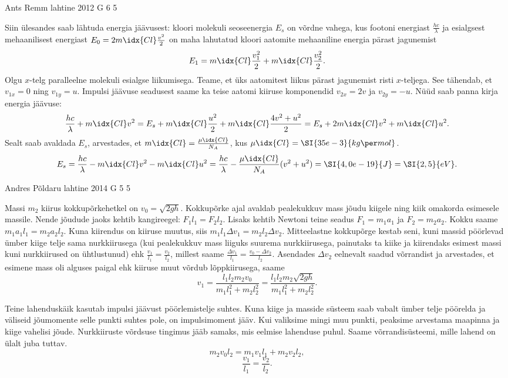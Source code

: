 \documentclass[11pt, twoside]{article}
\begin{document}
{%
{Ants Remm} %
{lahtine} %
{2012} %
{G 6} %
{5} %
{

\ifSolution
Siin ülesandes saab lähtuda energia jäävusest: kloori molekuli seoseenergia $E_s$ on võrdne vahega, kus footoni energiast $\frac{hc}{\lambda}$ ja esialgsest mehaanilisest energiast $E_0 = 2m\idx{Cl} \frac{v^2}{2} $ on maha lahutatud kloori aatomite mehaaniline energia pärast jagunemist
\[
E_1 = m\idx{Cl} \frac{v_1^2}{2} + m\idx{Cl} \frac{v_2^2}{2}.
\]
Olgu $x$-telg paralleelne molekuli esialgse liikumisega. Teame, et üks aatomitest liikus pärast jagunemist risti $x$-teljega. See tähendab, et $v_{1x} = 0$ ning $v_{1y} = u$. Impulsi jäävuse seadusest saame ka teise aatomi kiiruse komponendid $v_{2x} = 2 v$ ja $v_{2y} = -u$. Nüüd saab panna kirja energia jäävuse:
$$
	\frac{hc}{\lambda} + m\idx{Cl} v^2 = E_s + m\idx{Cl} \frac{u^2}{2} + m\idx{Cl} \frac{4v^2 + u^2}{2} = E_s + 2 m\idx{Cl} v^2 + m\idx{Cl} u^2.
$$
Sealt saab avaldada $E_s$, arvestades, et $m\idx{Cl} = \frac{\mu\idx{Cl}}{N_A}$, kus $\mu\idx{Cl} = \SI{35e-3}{kg\per mol}$.
$$ E_s = \frac{hc}{\lambda} - m\idx{Cl} v^2 - m\idx{Cl} u^2 = \frac{hc}{\lambda} - \frac{\mu\idx{Cl}}{N_A} (v^2 + u^2) = \SI{4,0e-19}{J} = \SI{2,5}{eV}.
$$
\fi
}

{Andres Põldaru} %
{lahtine} %
{2014} %
{G 5} %
{5} %
{

\ifSolution
Massi $m_2$ kiirus kokkupõrkehetkel on $v_0=\sqrt{2gh}$. Kokkupõrke ajal avaldab pealekukkuv mass jõudu kiigele ning kiik omakorda esimesele massile. Nende jõudude jaoks kehtib kangireegel: $F_1l_1=F_2l_2$. Lisaks kehtib Newtoni teine seadus $F_1=m_1a_1$ ja $F_2=m_2a_2$. Kokku saame $m_1a_1l_1=m_2a_2l_2$. Kuna kiirendus on kiiruse muutus, siis $m_1l_1\Delta v_1=m_2l_2\Delta v_2$. Mitteelastne kokkupõrge kestab seni, kuni massid pöörlevad ümber kiige telje sama nurkkiirusega (kui pealekukkuv mass liiguks suurema nurkkiirusega, painutaks ta kiike ja kiirendaks esimest massi kuni nurkkiirused on ühtlustunud) ehk $\frac{v_1}{l_1}=\frac{v_2}{l_2}$, millest saame $\frac{\Delta v_1}{l_1}=\frac{v_0-\Delta v_2}{l_2}$. Asendades $\Delta v_2$ eelnevalt saadud võrrandist ja arvestades, et esimene mass oli alguses paigal ehk kiiruse muut võrdub lõppkiirusega, saame 
\[
v_1=\frac{l_1l_2m_2v_0}{m_1l_1^2+m_2l_2^2}=\frac{l_1l_2m_2\sqrt{2gh}}{m_1l_1^2+m_2l_2^2}.
\]

Teine lahenduskäik kasutab impulsi jäävust pöörlemistelje suhtes. Kuna kiige ja masside süsteem saab vabalt ümber telje pöörelda ja väliseid jõumomente selle punkti suhtes pole, on impulsimoment jääv. Kui valiksime mingi muu punkti, peaksime arvestama maapinna ja kiige vahelisi jõude. Nurkkiiruste võrdsuse tingimus jääb samaks, mis eelmise lahenduse puhul. Saame võrrandisüsteemi, mille lahend on ülalt juba tuttav.
\[
 m_2v_0l_2=m_1v_1l_1+m_2v_2l_2,
\]
\[
\frac{v_1}{l_1}=\frac{v_2}{l_2}.
\]
\fi
}

}
\end{document}
